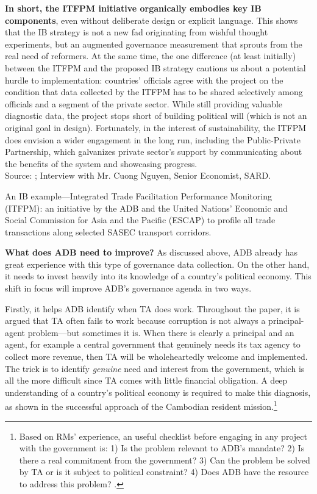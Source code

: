 \documentclass[12pt]{article}
\begin{document}
\begin{textbox}
  \textbf{In short, the ITFPM initiative organically embodies key IB components}, even without deliberate design or explicit language. This shows that the IB strategy is not a new fad originating from wishful thought experiments, but an augmented governance measurement that sprouts from the real need of reformers. At the same time, the one difference (at least initially) between the ITFPM and the proposed IB strategy cautions us about a potential hurdle to implementation: countries' officials agree with the project on the condition that data collected by the ITFPM has to be shared selectively among officials and a segment of the private sector. While still providing valuable diagnostic data, the project stops short of building political will (which is not an original goal in design). Fortunately, in the interest of sustainability, the ITFPM does envision a wider engagement in the long run, including the Public-Private Partnership, which galvanizes private sector's support by communicating about the benefits of the system and showcasing progress.\\

  Source: \citet{ADB-SARD2013}; Interview with Mr. Cuong Nguyen, Senior Economist, SARD.
  \caption[An IB example---ADB's Integrated Trade Facilitation Performance Monitoring]{An IB example---Integrated Trade Facilitation Performance Monitoring (ITFPM): an initiative by the ADB and the United Nations' Economic and Social Commission for Asia and the Pacific (ESCAP) to profile all trade transactions along selected SASEC transport corridors.}
  \label{box:tradefacilitation}
\end{textbox}

\textbf{What does ADB need to improve?} As discussed above, ADB already has great experience with this type of governance data collection. On the other hand, it needs to invest heavily into its knowledge of a country's political economy. This shift in focus will improve ADB's governance agenda in two ways.

Firstly, it helps ADB identify when TA does work. Throughout the paper, it is argued that TA often fails to work because corruption is not always a principal-agent problem---but sometimes it is. When there is clearly a principal and an agent, for example a central government that genuinely needs its tax agency to collect more revenue, then TA will be wholeheartedly welcome and implemented. The trick is to identify \textit{genuine} need and interest from the government, which is all the more difficult since TA comes with little financial obligation. A deep understanding of a country's political economy is required to make this diagnosis, as shown in the successful approach of the Cambodian resident mission.\footnote{Based on RMs' experience, an useful checklist before engaging in any project with the government is: 1) Is the problem relevant to ADB's mandate? 2) Is there a real commitment from the government? 3) Can the problem be solved by TA or is it subject to political constraint? 4) Does ADB have the resource to address this problem? \citep{ADB-IED2013}.}
\end{document}
